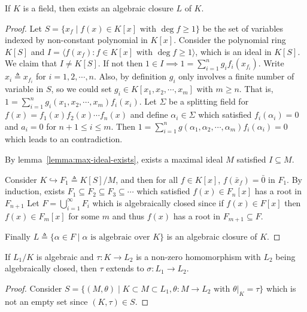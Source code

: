 \begin{theorem}
  If $K$ is a field, then exists an algebraic closure $L$ of $K$.

  \begin{proof}
    Let $S = \{ x_f \mid f(x) \in K[x] \text{ with } \deg f \geq 1 \}$ be the set of variables indexed by non-constant
    polynomial in $K[x]$. Consider the polynomial ring $K[S]$ and $I = \langle f(x_f) : f \in K[x] \text{ with } \deg f \geq 1 \rangle$,
    which is an ideal in $K[S]$. We claim that $I \neq K[S]$. If not then $1 \in I \implies 1 = \sum_{i = 1}^n g_i f_i(x_{f_i})$.
    Write $x_i \triangleq x_{f_i}$ for $i = 1, 2, \cdots, n$. Also, by definition $g_i$ only involves a finite number of
    variable in $S$, so we could set $g_i \in K[x_1, x_2, \cdots, x_m]$ with $m \geq n$. That is, $1 = \sum_{i = 1}^n g_i(x_1, x_2,
    \cdots, x_m) f_i(x_i)$. Let $\Sigma$ be a splitting field for $f(x) = f_1(x) f_2(x) \cdots f_n(x)$ and define $\alpha_i \in \Sigma$
    which satisfied $f_i(\alpha_i) = 0$ and $a_i = 0$ for $n+1 \leq i \leq m$. Then
    $1 = \sum_{i = 1}^n g(\alpha_1, \alpha_2, \cdots, \alpha_m) f_i(\alpha_i) = 0$ which leads to an contradiction.

    By lemma~\ref{lemma:max-ideal-exists}, exists a maximal ideal $M$ satisfied $I \subseteq M$.

    Consider $K \hookrightarrow F_1 \triangleq K[S] / M$, and then for all $f \in K[x]$, $f(\bar{x}_f) = \bar{0}$ in $F_1$.
    By induction, exists $F_1 \subseteq F_2 \subseteq F_3 \subseteq \cdots$ which satisfied $f(x) \in F_n[x]$ has a root in $F_{n+1}$
    Let $F = \bigcup_{i = 1}^\infty F_i$ which is algebraically closed since if $f(x) \in F[x]$ then $f(x) \in F_m[x]$
    for some $m$ and thus $f(x)$ has a root in $F_{m+1} \subseteq F$.

    Finally $L \triangleq \{ \alpha \in F \mid \alpha \text{ is algebraic over } K \}$ is an algebraic closure of $K$.
  \end{proof}

  \begin{lemma} \label{lemma:homo-extend-to-alg-closed-extension}
    If $L_1 / K$ is algebraic and $\tau: K \to L_2$ is a non-zero homomorphism with $L_2$ being algebraically closed,
    then $\tau$ extends to $\sigma: L_1 \to L_2$.

    \begin{proof}
      Consider $S = \{ (M, \theta) \mid K \subset M \subset L_1, \theta: M \to L_2 \text{ with } \theta\big|_K = \tau\}$
      which is not an empty set since $(K, \tau) \in S$.


\end{proof}
\end{lemma}
\end{theorem}
